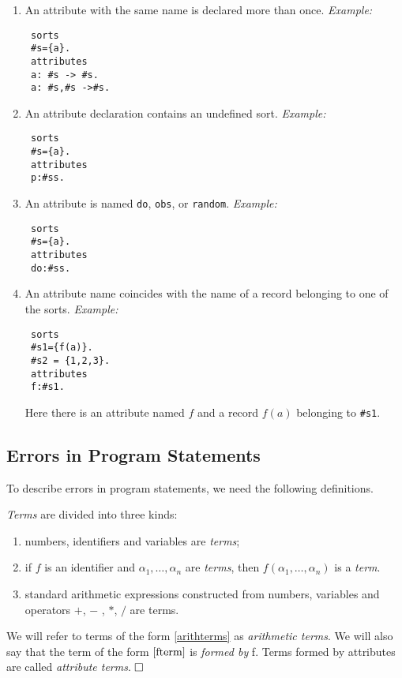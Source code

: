 \documentclass[12pt, letterpaper]{article}
\begin{document}
\begin{enumerate}
\item An attribute with the same name is declared more than once.
\textit{Example:}
\begin{verbatim}
 sorts
 #s={a}.
 attributes
 a: #s -> #s.
 a: #s,#s ->#s.
\end{verbatim}
\item An attribute declaration contains an undefined sort.
\textit{Example:}
\begin{verbatim}
 sorts
 #s={a}.
 attributes
 p:#ss.
\end{verbatim}

\item An attribute is named \texttt{do}, \texttt{obs}, or \texttt{random}.
\textit{Example:}
\begin{verbatim}
 sorts
 #s={a}.
 attributes
 do:#ss.
\end{verbatim}

\item An attribute name coincides with the name of a record belonging to one of the sorts.
\textit{Example:}
\begin{verbatim}
 sorts
 #s1={f(a)}.
 #s2 = {1,2,3}.
 attributes
 f:#s1.
\end{verbatim}
Here there is an attribute named $f$ and a record $f(a)$ belonging to \texttt{\#s1}.
\end{enumerate}
\subsection{Errors in Program Statements}\label{errorsinstatements}

To describe errors in program statements, we need the following definitions.

\begin{definition}[Term]
{\rm \textit{Terms} are divided into three kinds:
\begin{enumerate}[label=(\arabic*),itemsep=5pt]
 \item numbers, identifiers and variables are \textit{terms};
 \item\label{fterm} if $f$ is an identifier and $\alpha_1, \dots, \alpha_n$ are \textit{terms}, 
   then $f(\alpha_1,\dots, \alpha_n)$ is a \textit{term}.
 \item\label{arithterms} standard arithmetic expressions constructed from numbers, variables and operators $+$, $-$ , $*$, $/$ are terms. 
\end{enumerate}
\noindent
We will refer to terms of the form \ref{arithterms} as \textit{arithmetic terms}.
We will also say that the term of the form $\ref{fterm}$ is \textit{formed by} f. 
Terms formed by attributes are called \textit{attribute terms}.
$\hfill \Box$
}
\end{definition}
\end{document}
